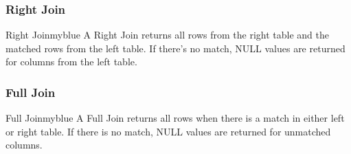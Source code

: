 \subsubsection{Right Join}
\begin{prettyBox}{Right Join}{myblue}
A Right Join returns all rows from the right table and the matched rows from the left table. If there’s no match,
NULL values are returned for columns from the left table.
\begin{center}
\end{center}
\end{prettyBox}

\subsubsection{Full Join}

\begin{prettyBox}{Full Join}{myblue}
A Full Join returns all rows when there is a match in either left or right table. If there is no match,
NULL values are returned for unmatched columns.
\begin{center}
\end{center}
\end{prettyBox}

